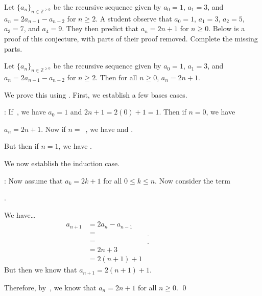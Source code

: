 \documentclass[11pt,letterpaper]{article}
\begin{document}
 Let $\{ a_n \}_{n \in \mathbb{Z}^{\geq 0}}$ be the recursive sequence given by $a_0= 1$, $a_1= 3$, and $a_n= 2a_{n - 1}  - a_{n - 2}$ for $n \geq 2$. A student observe that $a_0= 1$, $a_1= 3$, $a_2= 5$, $a_3= 7$, and $a_4= 9$. They then predict that $a_n= 2n + 1$ for $n \geq 0$. Below is a proof of this conjecture, with parts of their proof removed. Complete the missing parts. \pspace

 Let $\{ a_n \}_{n \in \mathbb{Z}^{\geq 0}}$ be the recursive sequence given by $a_0= 1$, $a_1= 3$, and $a_n= 2a_{n - 1}  - a_{n - 2}$ for $n \geq 2$. Then for all $n \geq 0$, $a_n= 2n + 1$. \pspace

 We prove this using \underline{\hspace{6cm}}. First, we establish a few bases cases. \pspace

: If \underline{\hspace{3cm}}\,, we have $a_0= 1$ and $2n + 1= 2(0) + 1= 1$. Then if $n= 0$, we have \pspace

$a_n= 2n + 1$. Now if $n=$ \underline{\hspace{3cm}}\,, we have \underline{\hspace{4cm}} and \underline{\hspace{4cm}}. \pspace

But then if $n= 1$, we have \underline{\hspace{3cm}}.  \pvspace{1cm}

We now establish the induction case. \pspace

: Now assume that $a_k= 2k + 1$ for all $0 \leq k \leq n$. Now consider the term \pspace

\underline{\hspace{3cm}}. \pspace

We have\dots
	\[
	\begin{aligned}
	a_{n + 1}&= 2a_n - a_{n - 1} \\[0.3cm]
	&= \underline{\hspace{6cm}} \\[0.3cm]
	&= \underline{\hspace{6cm}} \\[0.3cm]
	&= 2n + 3 \\[0.3cm]
	&= 2(n + 1) + 1
	\end{aligned}
	\] \pspace
But then we know that $a_{n + 1}= 2(n + 1) + 1$. \pspace

Therefore, by \underline{\hspace{6cm}}\,, we know that $a_n= 2n + 1$ for all $n \geq 0$. \qed
\end{document}

